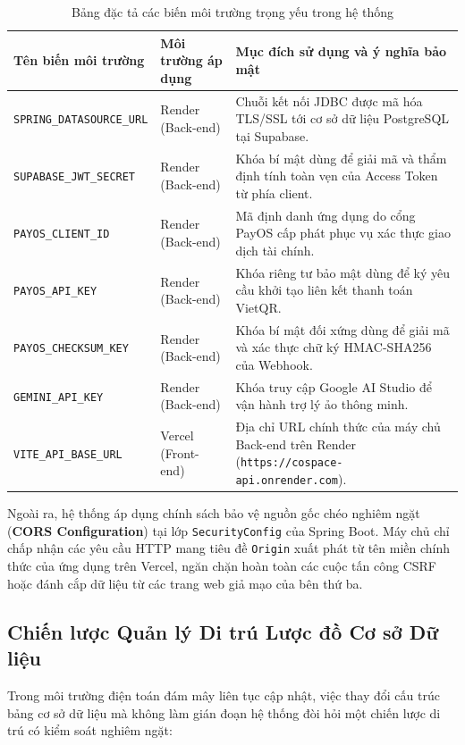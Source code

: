 \begin{table}[H]
\centering
\caption{Bảng đặc tả các biến môi trường trọng yếu trong hệ thống}
\label{tab:env-variables}
\renewcommand{\arraystretch}{1.3}
\begin{tabular}{|p{4.2cm}|p{4.5cm}|p{5.5cm}|}
\hline
\textbf{Tên biến môi trường} & \textbf{Môi trường áp dụng} & \textbf{Mục đích sử dụng và ý nghĩa bảo mật} \\
\hline
\texttt{SPRING\_DATASOURCE\_URL} & Render (Back-end) & Chuỗi kết nối JDBC được mã hóa TLS/SSL tới cơ sở dữ liệu PostgreSQL tại Supabase. \\
\hline
\texttt{SUPABASE\_JWT\_SECRET} & Render (Back-end) & Khóa bí mật dùng để giải mã và thẩm định tính toàn vẹn của Access Token từ phía client. \\
\hline
\texttt{PAYOS\_CLIENT\_ID} & Render (Back-end) & Mã định danh ứng dụng do cổng PayOS cấp phát phục vụ xác thực giao dịch tài chính. \\
\hline
\texttt{PAYOS\_API\_KEY} & Render (Back-end) & Khóa riêng tư bảo mật dùng để ký yêu cầu khởi tạo liên kết thanh toán VietQR. \\
\hline
\texttt{PAYOS\_CHECKSUM\_KEY} & Render (Back-end) & Khóa bí mật đối xứng dùng để giải mã và xác thực chữ ký HMAC-SHA256 của Webhook. \\
\hline
\texttt{GEMINI\_API\_KEY} & Render (Back-end) & Khóa truy cập Google AI Studio để vận hành trợ lý ảo thông minh. \\
\hline
\texttt{VITE\_API\_BASE\_URL} & Vercel (Front-end) & Địa chỉ URL chính thức của máy chủ Back-end trên Render (\texttt{https://cospace-api.onrender.com}). \\
\hline
\end{tabular}
\end{table}

Ngoài ra, hệ thống áp dụng chính sách bảo vệ nguồn gốc chéo nghiêm ngặt (\textbf{CORS Configuration}) tại lớp \texttt{SecurityConfig} của Spring Boot. Máy chủ chỉ chấp nhận các yêu cầu HTTP mang tiêu đề \texttt{Origin} xuất phát từ tên miền chính thức của ứng dụng trên Vercel, ngăn chặn hoàn toàn các cuộc tấn công CSRF hoặc đánh cắp dữ liệu từ các trang web giả mạo của bên thứ ba.

\subsection{Chiến lược Quản lý Di trú Lược đồ Cơ sở Dữ liệu}

Trong môi trường điện toán đám mây liên tục cập nhật, việc thay đổi cấu trúc bảng cơ sở dữ liệu mà không làm gián đoạn hệ thống đòi hỏi một chiến lược di trú có kiểm soát nghiêm ngặt:

